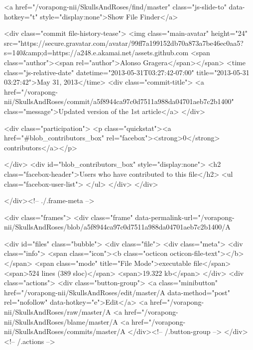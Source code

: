       <a href="/vorapong-nii/SkullsAndRoses/find/master" class="js-slide-to" data-hotkey="t" style="display:none">Show File Finder</a>


        
  <div class="commit file-history-tease">
    <img class="main-avatar" height="24" src="https://secure.gravatar.com/avatar/99ff7a199152db70a873a7be46ec0aa5?s=140&amp;d=https://a248.e.akamai.net/assets.github.com%
    <span class="author"><span rel="author">Alonso Gragera</span></span>
    <time class="js-relative-date" datetime="2013-05-31T03:27:42-07:00" title="2013-05-31 03:27:42">May 31, 2013</time>
    <div class="commit-title">
        <a href="/vorapong-nii/SkullsAndRoses/commit/a5f8944ca97c0d7511a988da04701aeb7c2b1400" class="message">Updated version of the 1st article</a>
    </div>

    <div class="participation">
      <p class="quickstat"><a href="#blob_contributors_box" rel="facebox"><strong>0</strong> contributors</a></p>
      
    </div>
    <div id="blob_contributors_box" style="display:none">
      <h2 class="facebox-header">Users who have contributed to this file</h2>
      <ul class="facebox-user-list">
      </ul>
    </div>
  </div>


    </div><!-- ./.frame-meta -->

    <div class="frames">
      <div class="frame" data-permalink-url="/vorapong-nii/SkullsAndRoses/blob/a5f8944ca97c0d7511a988da04701aeb7c2b1400/A%

        <div id="files" class="bubble">
          <div class="file">
            <div class="meta">
              <div class="info">
                <span class="icon"><b class="octicon octicon-file-text"></b></span>
                <span class="mode" title="File Mode">executable file</span>
                  <span>524 lines (389 sloc)</span>
                <span>19.322 kb</span>
              </div>
              <div class="actions">
                <div class="button-group">
                        <a class="minibutton"
                           href="/vorapong-nii/SkullsAndRoses/edit/master/A%
                           data-method="post" rel="nofollow" data-hotkey="e">Edit</a>
                  <a href="/vorapong-nii/SkullsAndRoses/raw/master/A%
                    <a href="/vorapong-nii/SkullsAndRoses/blame/master/A%
                  <a href="/vorapong-nii/SkullsAndRoses/commits/master/A%
                </div><!-- /.button-group -->
              </div><!-- /.actions -->

